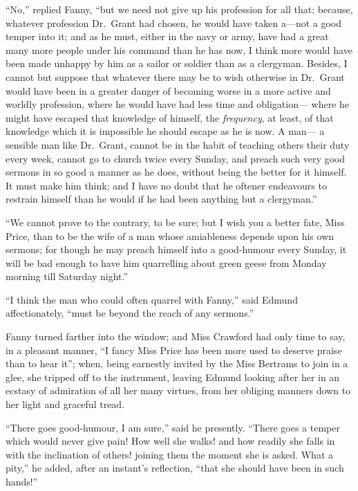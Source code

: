 ``No,'' replied Fanny, ``but we need not give up his profession
for all that; because, whatever profession Dr.\ Grant
had chosen, he would have taken a---not a good temper into it;
and as he must, either in the navy or army, have had a
great many more people under his command than he has now,
I think more would have been made unhappy by him as a
sailor or soldier than as a clergyman.  Besides, I cannot
but suppose that whatever there may be to wish otherwise
in Dr.\ Grant would have been in a greater danger of
becoming worse in a more active and worldly profession,
where he would have had less time and obligation---%
where he might have escaped that knowledge of himself,
the \emph{frequency}, at least, of that knowledge which it
is impossible he should escape as he is now.  A man---%
a sensible man like Dr.\ Grant, cannot be in the habit
of teaching others their duty every week, cannot go
to church twice every Sunday, and preach such very good
sermons in so good a manner as he does, without being
the better for it himself.  It must make him think;
and I have no doubt that he oftener endeavours to restrain
himself than he would if he had been anything but a clergyman.''

``We cannot prove to the contrary, to be sure; but I wish
you a better fate, Miss Price, than to be the wife of a man
whose amiableness depends upon his own sermons; for though
he may preach himself into a good-humour every Sunday,
it will be bad enough to have him quarrelling about green
geese from Monday morning till Saturday night.''

``I think the man who could often quarrel with Fanny,''
said Edmund affectionately, ``must be beyond the reach
of any sermons.''

Fanny turned farther into the window; and Miss
Crawford had only time to say, in a pleasant manner,
``I fancy Miss Price has been more used to deserve
praise than to hear it''; when, being earnestly invited
by the Miss Bertrams to join in a glee, she tripped off
to the instrument, leaving Edmund looking after her
in an ecstasy of admiration of all her many virtues,
from her obliging manners down to her light and graceful tread.

``There goes good-humour, I am sure,'' said he presently.
``There goes a temper which would never give pain!
How well she walks! and how readily she falls in with the
inclination of others! joining them the moment she is asked.
What a pity,'' he added, after an instant's reflection,
``that she should have been in such hands!''

